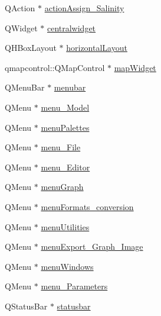 \begin{DoxyCompactItemize}
\item 
Q\+Action $\ast$ \mbox{\hyperlink{class_ui___main_window_a881a8fe60025b9ccf855ae0e387f3fae}{action\+Assign\+\_\+\+Salinity}}
\item 
Q\+Widget $\ast$ \mbox{\hyperlink{class_ui___main_window_a356f1cf3ebda15f1fac59467ee081b74}{centralwidget}}
\item 
Q\+H\+Box\+Layout $\ast$ \mbox{\hyperlink{class_ui___main_window_acd6fdc9ebacc4b25b834162380d75ce8}{horizontal\+Layout}}
\item 
qmapcontrol\+::\+Q\+Map\+Control $\ast$ \mbox{\hyperlink{class_ui___main_window_acc3660c47ea3dfaeb02bc87c4fe9d586}{map\+Widget}}
\item 
Q\+Menu\+Bar $\ast$ \mbox{\hyperlink{class_ui___main_window_adf43d9a67adaec750aaa956b5e082f09}{menubar}}
\item 
Q\+Menu $\ast$ \mbox{\hyperlink{class_ui___main_window_a7163892ecac6f1e584d59ab261993aa0}{menu\+\_\+\+Model}}
\item 
Q\+Menu $\ast$ \mbox{\hyperlink{class_ui___main_window_a15400eb4d8a474f93aa4e7771498b903}{menu\+Palettes}}
\item 
Q\+Menu $\ast$ \mbox{\hyperlink{class_ui___main_window_a6ee03935fb1f57a1dc88df7b5bd94a52}{menu\+\_\+\+File}}
\item 
Q\+Menu $\ast$ \mbox{\hyperlink{class_ui___main_window_a3ab2aa38983b05db83ec9bea5c7a4a04}{menu\+\_\+\+Editor}}
\item 
Q\+Menu $\ast$ \mbox{\hyperlink{class_ui___main_window_a93b2f8c82dc7c8d67163a3598ffd58ef}{menu\+Graph}}
\item 
Q\+Menu $\ast$ \mbox{\hyperlink{class_ui___main_window_a851b36ba5079f5ed38927995f4029abb}{menu\+Formats\+\_\+conversion}}
\item 
Q\+Menu $\ast$ \mbox{\hyperlink{class_ui___main_window_aee0b02e602738d11df28e7bf0ae97ad7}{menu\+Utilities}}
\item 
Q\+Menu $\ast$ \mbox{\hyperlink{class_ui___main_window_ad3ff5c1f4a7f99a8189aa82064d27467}{menu\+Export\+\_\+\+Graph\+\_\+\+Image}}
\item 
Q\+Menu $\ast$ \mbox{\hyperlink{class_ui___main_window_a92c1a8a2d86655587ef9bff5750ba21e}{menu\+Windows}}
\item 
Q\+Menu $\ast$ \mbox{\hyperlink{class_ui___main_window_a3bf2606f7da294b8f49b3640949b92b4}{menu\+\_\+\+Parameters}}
\item 
Q\+Status\+Bar $\ast$ \mbox{\hyperlink{class_ui___main_window_a1687cceb1e2787aa1f83e50433943a91}{statusbar}}
\item 

\end{DoxyCompactItemize}
